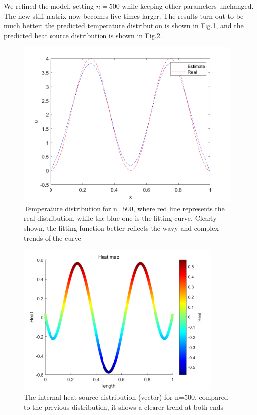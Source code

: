 \documentclass{article}
\begin{document}
     We refined the model, setting $n=500$ while keeping other parameters unchanged. The new stiff matrix now becomes five times larger. The results turn out to be much better: the predicted temperature distribution is shown in Fig.\ref{tem_500}, and the predicted heat source distribution is shown in Fig.\ref{heat_500}.
     
    \begin{figure}[H]
        \centering %
        \includegraphics[width=11cm]{pic/n=500.png} %
        \caption{Temperature distribution for n=500, where red line represents the real distribution, while the blue one is the fitting curve. Clearly shown, the fitting function better reflects the wavy and complex trends of the curve} %
        \label{tem_500}
    \end{figure}        

    
    \begin{figure}[H]
        \centering %
        \includegraphics[width=10cm]{pic/f_n=500.png} %
        \caption{The internal heat source distribution (vector) for n=500, compared to the previous distribution, it shows a clearer trend at both ends} %
        \label{heat_500}
    \end{figure}
    
\end{document}
